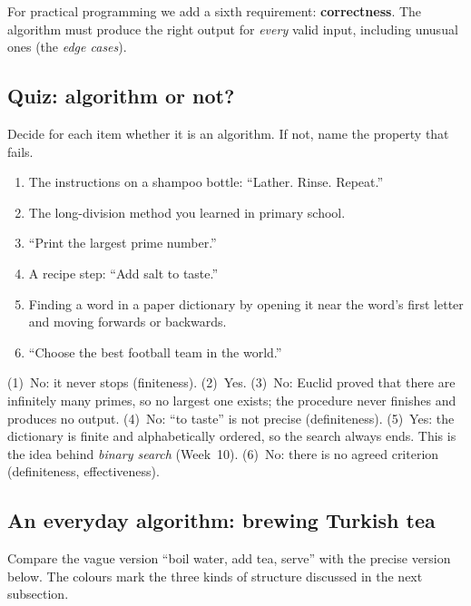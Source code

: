 \documentclass[11pt,a4paper]{article}
\newcommand{\term}[1]{\textbf{\color{ink}#1}}
\begin{document}
For practical programming we add a sixth requirement: \term{correctness}. The algorithm must produce the right output for \emph{every} valid input, including unusual ones (the \emph{edge cases}).

\subsection{Quiz: algorithm or not?}
Decide for each item whether it is an algorithm. If not, name the property that fails.
\begin{enumerate}[leftmargin=*,itemsep=1pt]
  \item The instructions on a shampoo bottle: ``Lather. Rinse. Repeat.''
  \item The long-division method you learned in primary school.
  \item ``Print the largest prime number.''
  \item A recipe step: ``Add salt to taste.''
  \item Finding a word in a paper dictionary by opening it near the word's first letter and moving forwards or backwards.
  \item ``Choose the best football team in the world.''
\end{enumerate}
\begin{notebox}[Answers]
(1)~No: it never stops (finiteness). (2)~Yes. (3)~No: Euclid proved that there are infinitely many primes, so no largest one exists; the procedure never finishes and produces no output. (4)~No: ``to taste'' is not precise (definiteness). (5)~Yes: the dictionary is finite and alphabetically ordered, so the search always ends. This is the idea behind \emph{binary search} (Week~10). (6)~No: there is no agreed criterion (definiteness, effectiveness).
\end{notebox}

\subsection{An everyday algorithm: brewing Turkish tea}
Compare the vague version ``boil water, add tea, serve'' with the precise version below. The colours mark the three kinds of structure discussed in the next subsection.
\end{document}
